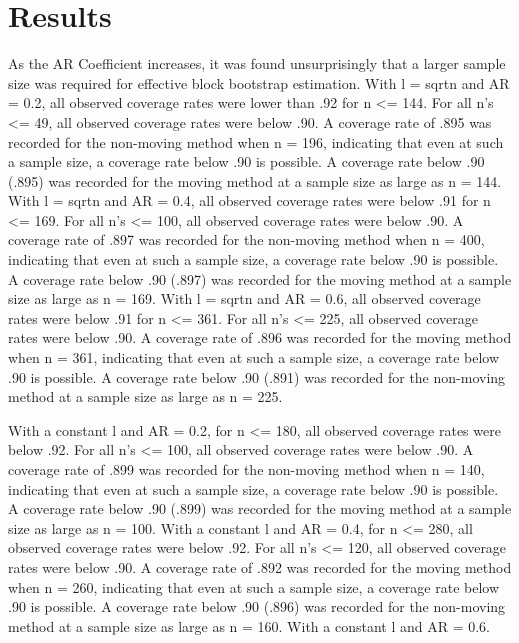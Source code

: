 \documentclass[12pt, letterpaper, titlepage]{article}
\begin{document}
\section{Results}
\label{sec:results}

As the AR Coefficient increases, it was found unsurprisingly that a larger sample size was 
required for effective block bootstrap estimation. With l = sqrt{n} and AR = 0.2, all 
observed coverage rates were lower than .92 for n <= 144. For all n's <= 49, all observed 
coverage rates were below .90. A coverage rate of .895 was recorded for the non-moving 
method when n = 196, indicating that even at such a sample size, a coverage rate below .90 
is possible. A coverage rate below .90 (.895) was recorded for the moving method at a 
sample size as large as n = 144. With l = sqrt{n} and AR = 0.4, all observed coverage 
rates were below .91 for n <= 169. For all n's <= 100, all observed coverage rates were 
below .90. A coverage rate of .897 was recorded for the non-moving method when n = 400, 
indicating that even at such a sample size, a coverage rate below .90 is possible. A 
coverage rate below .90 (.897) was recorded for the moving method at a sample size as 
large as n = 169. With l = sqrt{n} and AR = 0.6, all observed coverage rates were below 
.91 for n <= 361. For all n's <= 225, all observed coverage rates were below .90. A 
coverage rate of .896 was recorded for the moving method when n = 361, indicating that 
even at such a sample size, a coverage rate below .90 is possible. A coverage rate below 
.90 (.891) was recorded for the non-moving method at a sample size as large as n = 225.

With a constant l and AR = 0.2, for n <= 180, all observed coverage rates were below .92. 
For all n's <= 100, all observed coverage rates were below .90. A coverage rate of .899 
was recorded for the non-moving method when n = 140, indicating that even at such a sample 
size, a coverage rate below .90 is possible. A coverage rate below .90 (.899) was recorded 
for the moving method at a sample size as large as n = 100. With a constant l and AR = 
0.4, for n <= 280, all observed coverage rates were below .92. For all n's <= 120, all 
observed coverage rates were below .90. A coverage rate of .892 was recorded for the 
moving method when n = 260, indicating that even at such a sample size, a coverage rate 
below .90 is possible. A coverage rate below .90 (.896) was recorded for the non-moving 
method at a sample size as large as n = 160. With a constant l and AR = 0.6.
\end{document}
